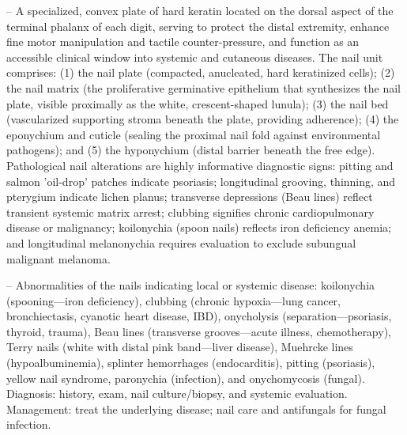 -- A specialized, convex plate of hard keratin located on the dorsal aspect of the terminal phalanx of each digit, serving to protect the distal extremity, enhance fine motor manipulation and tactile counter-pressure, and function as an accessible clinical window into systemic and cutaneous diseases. The nail unit comprises: (1) the nail plate (compacted, anucleated, hard keratinized cells); (2) the nail matrix (the proliferative germinative epithelium that synthesizes the nail plate, visible proximally as the white, crescent-shaped lunula); (3) the nail bed (vascularized supporting stroma beneath the plate, providing adherence); (4) the eponychium and cuticle (sealing the proximal nail fold against environmental pathogens); and (5) the hyponychium (distal barrier beneath the free edge). Pathological nail alterations are highly informative diagnostic signs: pitting and salmon 'oil-drop' patches indicate psoriasis; longitudinal grooving, thinning, and pterygium indicate lichen planus; transverse depressions (Beau lines) reflect transient systemic matrix arrest; clubbing signifies chronic cardiopulmonary disease or malignancy; koilonychia (spoon nails) reflects iron deficiency anemia; and longitudinal melanonychia requires evaluation to exclude subungual malignant melanoma.

-- Abnormalities of the nails indicating local or systemic disease: koilonychia (spooning—iron deficiency), clubbing (chronic hypoxia—lung cancer, bronchiectasis, cyanotic heart disease, IBD), onycholysis (separation—psoriasis, thyroid, trauma), Beau lines (transverse grooves—acute illness, chemotherapy), Terry nails (white with distal pink band—liver disease), Muehrcke lines (hypoalbuminemia), splinter hemorrhages (endocarditis), pitting (psoriasis), yellow nail syndrome, paronychia (infection), and onychomycosis (fungal). Diagnosis: history, exam, nail culture/biopsy, and systemic evaluation. Management: treat the underlying disease; nail care and antifungals for fungal infection.

